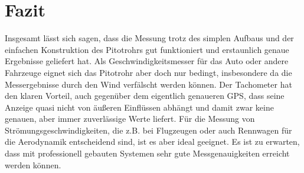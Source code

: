 \section{Fazit}
Insgesamt lässt sich sagen, dass die Messung trotz des simplen Aufbaus und der einfachen Konstruktion des Pitotrohrs gut funktioniert und erstaunlich genaue Ergebnisse geliefert hat. Als Geschwindigkeitsmesser für das Auto oder andere Fahrzeuge eignet sich das Pitotrohr aber doch nur bedingt, insbesondere da die Messergebnisse durch den Wind verfälscht werden können. Der Tachometer hat den klaren Vorteil, auch gegenüber dem eigentlich genaueren GPS, dass seine Anzeige quasi nicht von äußeren Einflüssen abhängt und damit zwar keine genauen, aber immer zuverlässige Werte liefert. Für die Messung von Strömungsgeschwindigkeiten, die z.B. bei Flugzeugen oder auch Rennwagen für die Aerodynamik entscheidend sind, ist es aber ideal geeignet. Es ist zu erwarten, dass mit professionell gebauten Systemen sehr gute Messgenauigkeiten erreicht werden können.